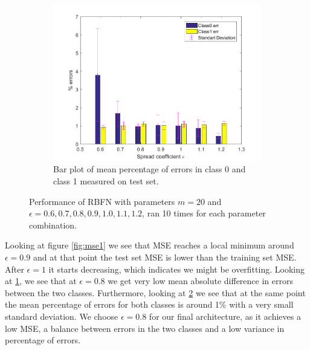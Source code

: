 \documentclass[a4paper, 11pt]{article}
\begin{document}
\begin{figure}[h!]
\begin{subfigure}[t]{0.32\textwidth}
        \label{fig:errorplot1}
    \end{subfigure}
    \hfill %
    \begin{subfigure}[t]{0.32\textwidth}
        \includegraphics[width=\textwidth]{../figures/perf/errorbar_m(20-20)_e(6-12).png}
        \caption{Bar plot of mean percentage of errors in class 0 and class 1 measured on test set.}
        \label{fig:errorbar1}
    \end{subfigure}
    \caption{Performance of RBFN with parameters $m = 20$ and $\epsilon = 0.6,0.7, 0.8, 0.9, 1.0, 1.1, 1.2$, ran 10  times for each parameter combination.}\label{fig:performance1}
\end{figure}


Looking at figure \ref{fig:mse1} we see that MSE reaches a local minimum around $\epsilon = 0.9$ and at that point the test set MSE is lower than the training set MSE. After $\epsilon = 1$ it starts decreasing, which indicates we might be overfitting. Looking at \ref{fig:errorplot1}, we see that at $\epsilon = 0.8$ we get very low mean absolute difference in errors between the two classes. Furthermore, looking at \ref{fig:errorbar1} we see that at the same point the mean percentage of errors for both classes is around 1\% with a very small standard deviation. We choose $\epsilon = 0.8$ for our final architecture, as it  achieves a low MSE, a balance between errors in the two classes and a low variance in percentage of errors.
\end{document}
